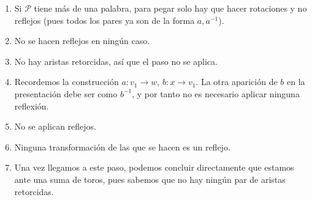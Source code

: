 {    \begin{enumerate}
        \item Si $\mathcal{P}$ tiene más de una palabra, para pegar solo hay que hacer rotaciones y no reflejos (pues todos los pares ya son de la forma $a, a^{-1}$).
        \item No se hacen reflejos en ningún caso.
        \item No hay aristas retorcidas, así que el paso no se aplica.
        \item Recordemos la construcción $ a: v_1\to w$, $b: x \to v_1$. La otra aparición de $b$ en la presentación debe ser como $b^{-1}$, y por tanto no es necesario aplicar ninguna reflexión.
        \item No se aplican reflejos.
        \item Ninguna transformación de las que se hacen es un reflejo.
        \item Una vez llegamos a este paso, podemos concluir directamente que estamos ante una suma de toros, pues sabemos que no hay ningún par de aristas retorcidas. 
    \end{enumerate}
}
